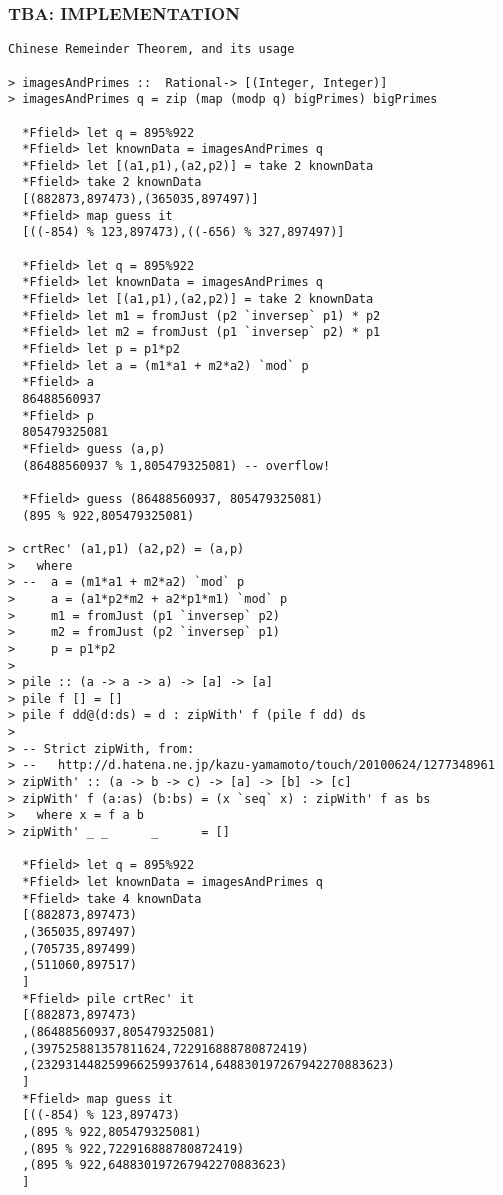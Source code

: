 \documentclass[11pt]{book}
\begin{document}
\subsubsection{TBA: IMPLEMENTATION}
\begin{verbatim}
Chinese Remeinder Theorem, and its usage
 
> imagesAndPrimes ::  Rational-> [(Integer, Integer)]
> imagesAndPrimes q = zip (map (modp q) bigPrimes) bigPrimes

  *Ffield> let q = 895%922
  *Ffield> let knownData = imagesAndPrimes q
  *Ffield> let [(a1,p1),(a2,p2)] = take 2 knownData 
  *Ffield> take 2 knownData 
  [(882873,897473),(365035,897497)]
  *Ffield> map guess it
  [((-854) % 123,897473),((-656) % 327,897497)]
  
  *Ffield> let q = 895%922
  *Ffield> let knownData = imagesAndPrimes q
  *Ffield> let [(a1,p1),(a2,p2)] = take 2 knownData 
  *Ffield> let m1 = fromJust (p2 `inversep` p1) * p2
  *Ffield> let m2 = fromJust (p1 `inversep` p2) * p1
  *Ffield> let p = p1*p2
  *Ffield> let a = (m1*a1 + m2*a2) `mod` p
  *Ffield> a
  86488560937
  *Ffield> p
  805479325081
  *Ffield> guess (a,p)
  (86488560937 % 1,805479325081) -- overflow!

  *Ffield> guess (86488560937, 805479325081)
  (895 % 922,805479325081)

> crtRec' (a1,p1) (a2,p2) = (a,p)
>   where
> --  a = (m1*a1 + m2*a2) `mod` p
>     a = (a1*p2*m2 + a2*p1*m1) `mod` p
>     m1 = fromJust (p1 `inversep` p2) 
>     m2 = fromJust (p2 `inversep` p1)
>     p = p1*p2
>
> pile :: (a -> a -> a) -> [a] -> [a]
> pile f [] = []
> pile f dd@(d:ds) = d : zipWith' f (pile f dd) ds
>
> -- Strict zipWith, from:
> --   http://d.hatena.ne.jp/kazu-yamamoto/touch/20100624/1277348961
> zipWith' :: (a -> b -> c) -> [a] -> [b] -> [c]
> zipWith' f (a:as) (b:bs) = (x `seq` x) : zipWith' f as bs
>   where x = f a b
> zipWith' _ _      _      = []

  *Ffield> let q = 895%922
  *Ffield> let knownData = imagesAndPrimes q
  *Ffield> take 4 knownData 
  [(882873,897473)
  ,(365035,897497)
  ,(705735,897499)
  ,(511060,897517)
  ]
  *Ffield> pile crtRec' it
  [(882873,897473)
  ,(86488560937,805479325081)
  ,(397525881357811624,722916888780872419)
  ,(232931448259966259937614,648830197267942270883623)
  ]
  *Ffield> map guess it
  [((-854) % 123,897473)
  ,(895 % 922,805479325081)
  ,(895 % 922,722916888780872419)
  ,(895 % 922,648830197267942270883623)
  ]
\end{verbatim}
\end{document}
